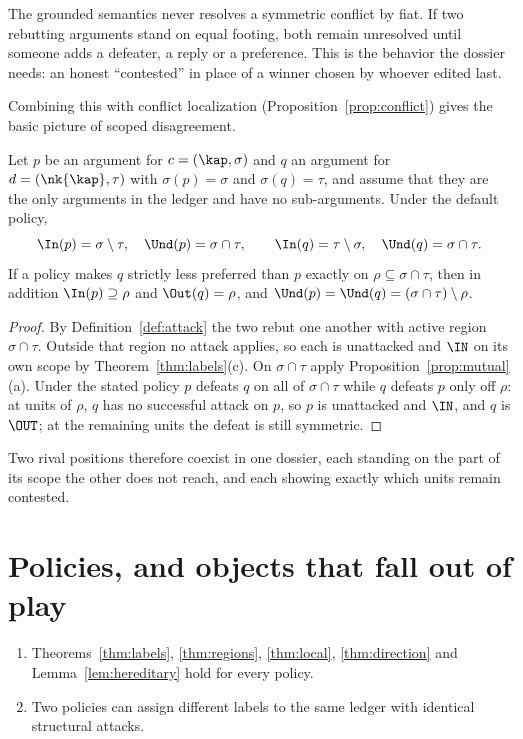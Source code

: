 The grounded semantics never resolves a symmetric conflict by fiat. If two rebutting arguments stand on equal footing, both remain unresolved until someone adds a defeater, a reply or a preference. This is the behavior the dossier needs: an honest ``contested'' in place of a winner chosen by whoever edited last.

Combining this with conflict localization (Proposition~\ref{prop:conflict}) gives the basic picture of scoped disagreement.

\begin{proposition}\label{prop:scoped}
Let $p$ be an argument for $c=(\kap,\sigma)$ and $q$ an argument for $d=(\nk{\kap},\tau)$ with $\sigma(p)=\sigma$ and $\sigma(q)=\tau$, and assume that they are the only arguments in the ledger and have no sub-arguments. Under the default policy,
\[
\In(p)=\sigma\setminus\tau,\quad \Und(p)=\sigma\cap\tau,\qquad \In(q)=\tau\setminus\sigma,\quad \Und(q)=\sigma\cap\tau.
\]
If a policy makes $q$ strictly less preferred than $p$ exactly on $\rho\subseteq\sigma\cap\tau$, then in addition $\In(p)\supseteq\rho$ and $\Out(q)=\rho$, and $\Und(p)=\Und(q)=(\sigma\cap\tau)\setminus\rho$.
\end{proposition}

\begin{proof}
By Definition~\ref{def:attack} the two rebut one another with active region $\sigma\cap\tau$. Outside that region no attack applies, so each is unattacked and $\IN$ on its own scope by Theorem~\ref{thm:labels}(c). On $\sigma\cap\tau$ apply Proposition~\ref{prop:mutual}(a). Under the stated policy $p$ defeats $q$ on all of $\sigma\cap\tau$ while $q$ defeats $p$ only off $\rho$: at units of $\rho$, $q$ has no successful attack on $p$, so $p$ is unattacked and $\IN$, and $q$ is $\OUT$; at the remaining units the defeat is still symmetric.
\end{proof}

Two rival positions therefore coexist in one dossier, each standing on the part of its scope the other does not reach, and each showing exactly which units remain contested.

\section{Policies, and objects that fall out of play}

\begin{theorem}\label{thm:policy}
\begin{enumerate}[label=(\alph*)]
\item Theorems~\ref{thm:labels}, \ref{thm:regions}, \ref{thm:local}, \ref{thm:direction} and Lemma~\ref{lem:hereditary} hold for every policy.
\item Two policies can assign different labels to the same ledger with identical structural attacks.
\end{enumerate}
\end{theorem}

